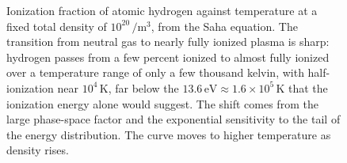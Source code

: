 \begin{figure}[htbp]
\centering
{}
\caption[Saha ionization fraction of hydrogen]{Ionization fraction of
atomic hydrogen against temperature at a fixed total density of
$10^{20}\,\si{\per\cubic\meter}$, from the Saha equation. The transition
from neutral gas to nearly fully ionized plasma is sharp: hydrogen passes
from a few percent ionized to almost fully ionized over a temperature
range of only a few thousand kelvin, with half-ionization near
$10^{4}\,\si{\kelvin}$, far below the $13.6\,\si{\electronvolt}\approx
1.6\times10^{5}\,\si{\kelvin}$ that the ionization energy alone would
suggest. The shift comes from the large phase-space factor and the
exponential sensitivity to the tail of the energy distribution. The curve
moves to higher temperature as density rises.}
\label{fig:vol04ch13:saha-fraction}
\end{figure}

